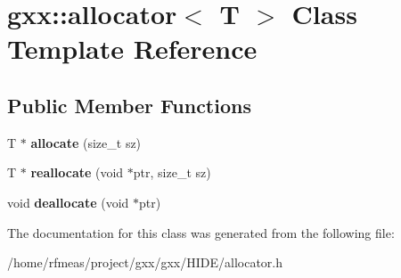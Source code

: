\hypertarget{classgxx_1_1allocator}{}\section{gxx\+:\+:allocator$<$ T $>$ Class Template Reference}
\label{classgxx_1_1allocator}
\subsection*{Public Member Functions}
\begin{DoxyCompactItemize}
\item 
T $\ast$ {\bfseries allocate} (size\+\_\+t sz)\hypertarget{classgxx_1_1allocator_aa7136afcf5b11a1076ab924c01b5558e}{}\label{classgxx_1_1allocator_aa7136afcf5b11a1076ab924c01b5558e}

\item 
T $\ast$ {\bfseries reallocate} (void $\ast$ptr, size\+\_\+t sz)\hypertarget{classgxx_1_1allocator_a66dda3a13ad38faa584a69ce7a5c110d}{}\label{classgxx_1_1allocator_a66dda3a13ad38faa584a69ce7a5c110d}

\item 
void {\bfseries deallocate} (void $\ast$ptr)\hypertarget{classgxx_1_1allocator_a04b60ba5f185526c143770c3a93f322d}{}\label{classgxx_1_1allocator_a04b60ba5f185526c143770c3a93f322d}

\end{DoxyCompactItemize}


The documentation for this class was generated from the following file\+:\begin{DoxyCompactItemize}
\item 
/home/rfmeas/project/gxx/gxx/\+H\+I\+D\+E/allocator.\+h\end{DoxyCompactItemize}
